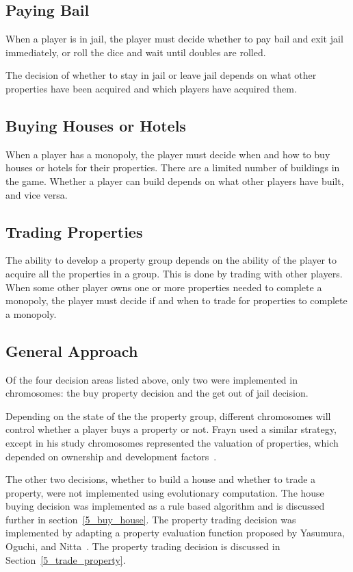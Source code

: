 \subsection{Paying Bail}
When a player is in jail, the player must decide whether to pay bail and exit
jail immediately, or roll the dice and wait until doubles are rolled.

The decision of whether to stay in jail or leave jail depends on what other
properties have been acquired and which players have acquired them.

\subsection{Buying Houses or Hotels}
When a player has a monopoly, the player must decide when and how to buy houses
or hotels for their properties. There are a limited number of buildings in the
game. Whether a player can build depends on what other players have built, and
vice versa.

\subsection{Trading Properties}
The ability to develop a property group depends on the ability of the player to
acquire all the properties in a group. This is done by trading with other
players. When some other player owns one or more properties needed to complete a
monopoly, the player must decide if and when to trade for properties to complete
a monopoly.

\subsection{General Approach}

Of the four decision areas listed above, only two were implemented in
chromosomes: the buy property decision and the get out of jail decision.

Depending on the state of the the property group, different chromosomes will
control whether a player buys a property or not. Frayn used a similar strategy,
except in his study chromosomes represented the valuation of properties, which
depended on ownership and development factors~\cite{DBLP:conf/cig/Frayn05}.

The other two decisions, whether to build a house and whether to trade a
property, were not implemented using evolutionary computation. The house buying
decision was implemented as a rule based algorithm and is discussed further in
section~\ref{5_buy_house}. The property trading decision was implemented by
adapting a property evaluation function proposed by Yasumura, Oguchi, and
Nitta~\cite{Yasumura2001Negotiate}. The property trading decision is discussed
in Section~\ref{5_trade_property}.


